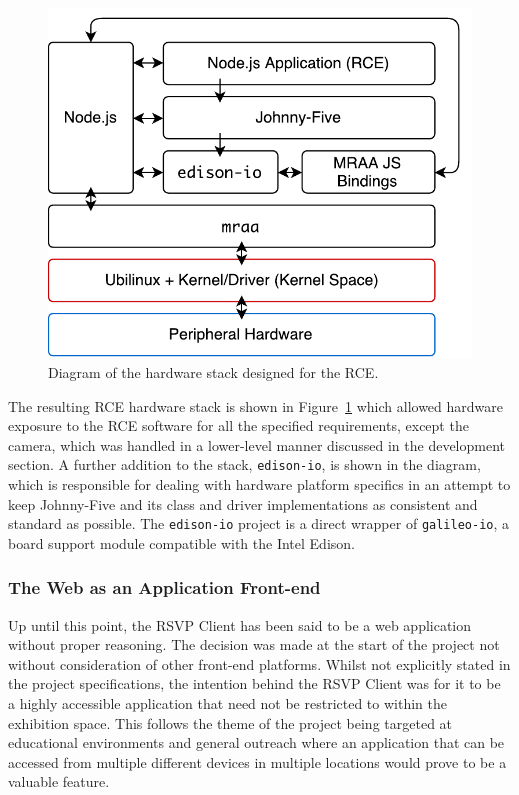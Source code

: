       \begin{figure}[h!]
        \centering
        \includegraphics[width=0.5\linewidth]{figures/softDesign-rceHardwarePlatformStack}
        \caption[Diagram of the hardware stack designed for the RCE.]{Diagram of the hardware stack designed for the RCE.}
        \label{fig:softDesign-rceHardwarePlatformStack}
      \end{figure}
      
      The resulting RCE hardware stack is shown in Figure~\ref{fig:softDesign-rceHardwarePlatformStack} which allowed hardware exposure to the RCE software for all the specified requirements, except the camera, which was handled in a lower-level manner discussed in the development section. A further addition to the stack, \texttt{edison-io}, is shown in the diagram, which is responsible for dealing with hardware platform specifics in an attempt to keep Johnny-Five and its class and driver implementations as consistent and standard as possible. The \texttt{edison-io} project is a direct wrapper of \texttt{galileo-io}, a board support module compatible with the Intel Edison.
      
    \subsubsection{The Web as an Application Front-end}
    \label{subsubsec:applicationFrontend}
      Up until this point, the RSVP Client has been said to be a web application without proper reasoning. The decision was made at the start of the project not without consideration of other front-end platforms. Whilst not explicitly stated in the project specifications, the intention behind the RSVP Client was for it to be a highly accessible application that need not be restricted to within the exhibition space. This follows the theme of the project being targeted at educational environments and general outreach where an application that can be accessed from multiple different devices in multiple locations would prove to be a valuable feature.
      
